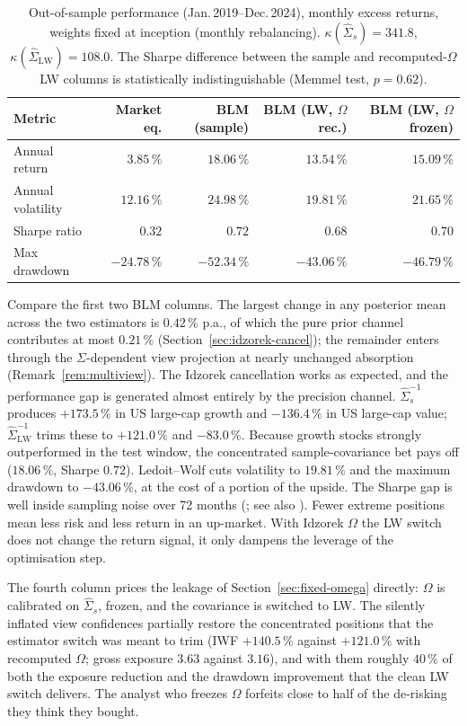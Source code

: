 \documentclass[a4paper,11pt]{article}
\theoremstyle{plain}
\theoremstyle{definition}
\newcommand{\Om}{\Omega}
\newcommand{\LW}{\mathrm{LW}}
\begin{document}
\begin{table}[H]
\centering
\renewcommand{\arraystretch}{1.15}
\caption{Out-of-sample performance (Jan.\,2019--Dec.\,2024), monthly
excess returns, weights fixed at inception (monthly rebalancing).
$\kappa(\hat\Sigma_s) = 341.8$, $\kappa(\hat\Sigma_{\LW}) = 108.0$.
The Sharpe difference between the sample and recomputed-$\Omega$ LW
columns is statistically indistinguishable (Memmel test, $p = 0.62$).}
\label{tab:backtest}
\small
\begin{tabular}{lrrrr}
\toprule
Metric & Market eq. & BLM (sample) & BLM (LW, $\Om$ rec.) & BLM (LW, $\Om$ frozen) \\
\midrule
Annual return     & $3.85\,\%$   & $18.06\,\%$  & $13.54\,\%$  & $15.09\,\%$ \\
Annual volatility & $12.16\,\%$  & $24.98\,\%$  & $19.81\,\%$  & $21.65\,\%$ \\
Sharpe ratio      & $0.32$       & $0.72$       & $0.68$       & $0.70$ \\
Max drawdown      & $-24.78\,\%$ & $-52.34\,\%$ & $-43.06\,\%$ & $-46.79\,\%$ \\
\bottomrule
\end{tabular}
\end{table}

Compare the first two BLM columns. The largest change in any posterior
mean across the two estimators is $0.42\,\%$ p.a., of which the pure
prior channel contributes at most $0.21\,\%$
(Section~\ref{sec:idzorek-cancel}); the remainder enters through the
$\Sigma$-dependent view projection at nearly unchanged absorption
(Remark~\ref{rem:multiview}). The Idzorek cancellation works as
expected, and the performance gap is generated almost entirely by the
precision channel. $\hat\Sigma_s^{-1}$ produces $+173.5\,\%$ in US
large-cap growth and $-136.4\,\%$ in US large-cap value;
$\hat\Sigma_{\LW}^{-1}$ trims these to $+121.0\,\%$ and $-83.0\,\%$.
Because growth stocks strongly outperformed in the test window, the
concentrated sample-covariance bet pays off ($18.06\,\%$, Sharpe
$0.72$). Ledoit--Wolf cuts volatility to $19.81\,\%$ and the maximum
drawdown to $-43.06\,\%$, at the cost of a portion of the upside. The
Sharpe gap is well inside sampling noise over 72 months
(\citealp{Memmel2003}; see also \citealp{LedoitWolf2008}). Fewer extreme
positions mean less risk and less return in an up-market. With Idzorek
$\Omega$ the LW switch does not change the return signal, it only
dampens the leverage of the optimisation step.

The fourth column prices the leakage of Section~\ref{sec:fixed-omega}
directly: $\Omega$ is calibrated on $\hat\Sigma_s$, frozen, and the
covariance is switched to LW. The silently inflated view confidences
partially restore the concentrated positions that the estimator switch
was meant to trim (IWF $+140.5\,\%$ against $+121.0\,\%$ with recomputed
$\Omega$; gross exposure $3.63$ against $3.16$), and with them roughly
$40\,\%$ of both the exposure reduction and the drawdown improvement
that the clean LW switch delivers. The analyst who freezes $\Omega$
forfeits close to half of the de-risking they think they bought.
\end{document}
